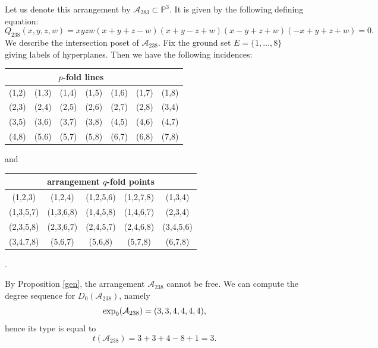 \documentclass[11pt]{article}
\theoremstyle{plain}
\theoremstyle{definition}
\begin{document}
\noindent
{}
\vskip 5pt
\noindent
Let us denote this arrangement by $\mathcal{A}_{283} \subset \mathbb{P}^{3}$. It is given by the following defining equation:
$$Q_{238}(x,y,z,w) = xyzw(x+y+z-w)(x+y-z+w)(x-y+z+w)(-x+y+z+w)=0.$$
We describe the intersection poset of $\mathcal{A}_{238}$. Fix the ground set $E = \{1, \ldots , 8\}$ giving labels of hyperplanes. Then we have the following incidences:
\begin{center}
\begin{tabular}{ c c c c c c c }
\multicolumn{6}{c}{$p$-fold lines} \\\hline \hline
 (1,2) &  (1,3) &  (1,4) &  (1,5) &  (1,6) &  (1,7) &  (1,8)\\
 (2,3) &  (2,4) &  (2,5) &  (2,6) &  (2,7) &  (2,8) &  (3,4)\\
 (3,5) &  (3,6) &  (3,7) &  (3,8) &  (4,5) &  (4,6) &  (4,7)\\
 (4,8) &  (5,6) &  (5,7) &  (5,8) &  (6,7) &  (6,8) &  (7,8)\\
\end{tabular}
\end{center}
and 
\begin{center}
\begin{tabular}{ c c c c c }
\multicolumn{5}{c}{arrangement $q$-fold points} \\ \hline \hline 
 (1,2,3) & (1,2,4) & (1,2,5,6) &  (1,2,7,8) &  (1,3,4) \\
 (1,3,5,7) &  (1,3,6,8) &  (1,4,5,8) &  (1,4,6,7) &  (2,3,4)\\
 (2,3,5,8) &  (2,3,6,7) & (2,4,5,7) &  (2,4,6,8) &  (3,4,5,6)\\  (3,4,7,8) &  (5,6,7) &  (5,6,8) &  (5,7,8) &  (6,7,8) \\ 
\end{tabular}.
\end{center}
By Proposition \ref{gen}, the arrangement $\mathcal{A}_{238}$ cannot be free. We can compute the degree sequence for $D_{0}(\mathcal{A}_{238})$, namely
$${\rm exp}_{0}(\mathcal{A}_{238}) = (3,3,4,4,4,4),$$
hence its type is equal to
$$t(\mathcal{A}_{238})=3+3+4-8+1 = 3.$$

\end{document}
